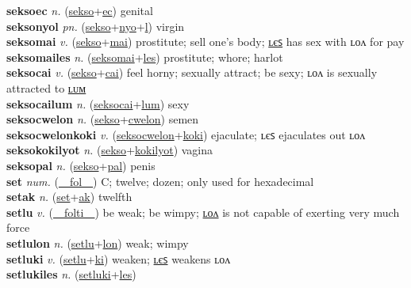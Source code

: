 \textbf{seksoec} \textit{n.} (\hyperref[sekso]{sekso}+\hyperref[ec]{ec})
genital \label{seksoec} \\
\textbf{seksonyol} \textit{pn.} (\hyperref[sekso]{sekso}+\hyperref[nyo]{nyo}+\hyperref[l]{l})
virgin \label{seksonyol} \\
\textbf{seksomai} \textit{v.} (\hyperref[sekso]{sekso}+\hyperref[mai]{mai})
prostitute; sell one’s body; \hyperref[seksomailes]{ʟєꜱ} has sex with ʟᴏᴧ for pay \label{seksomai} \\
\textbf{seksomailes} \textit{n.} (\hyperref[seksomai]{seksomai}+\hyperref[les]{les})
prostitute; whore; harlot \label{seksomailes} \\
\textbf{seksocai} \textit{v.} (\hyperref[sekso]{sekso}+\hyperref[cai]{cai})
feel horny; sexually attract; be sexy; ʟᴏᴧ is sexually attracted to \hyperref[seksocailum]{ʟᴜᴍ} \label{seksocai} \\
\textbf{seksocailum} \textit{n.} (\hyperref[seksocai]{seksocai}+\hyperref[lum]{lum})
sexy \label{seksocailum} \\
\textbf{seksocwelon} \textit{n.} (\hyperref[sekso]{sekso}+\hyperref[cwelon]{cwelon})
semen \label{seksocwelon} \\
\textbf{seksocwelonkoki} \textit{v.} (\hyperref[seksocwelon]{seksocwelon}+\hyperref[koki]{koki})
ejaculate; ʟєꜱ ejaculates out ʟᴏᴧ \label{seksocwelonkoki} \\
\textbf{seksokokilyot} \textit{n.} (\hyperref[sekso]{sekso}+\hyperref[kokilyot]{kokilyot})
vagina \label{seksokokilyot} \\
\textbf{seksopal} \textit{n.} (\hyperref[sekso]{sekso}+\hyperref[pal]{pal})
penis \label{seksopal} \\
\textbf{set} \textit{num.} (\hyperref[fol]{~~fol~~})
C; twelve; dozen; only used for hexadecimal \label{set} \\
\textbf{setak} \textit{n.} (\hyperref[set]{set}+\hyperref[ak]{ak})
twelfth \label{setak} \\
\textbf{setlu} \textit{v.} (\hyperref[folti]{~~folti~~})
be weak; be wimpy; \hyperref[setlulon]{ʟᴏᴧ} is not capable of exerting very much force \label{setlu} \\
\textbf{setlulon} \textit{n.} (\hyperref[setlu]{setlu}+\hyperref[lon]{lon})
weak; wimpy \label{setlulon} \\
\textbf{setluki} \textit{v.} (\hyperref[setlu]{setlu}+\hyperref[ki]{ki})
weaken; \hyperref[setlukiles]{ʟєꜱ} weakens ʟᴏᴧ \label{setluki} \\
\textbf{setlukiles} \textit{n.} (\hyperref[setluki]{setluki}+\hyperref[les]{les})
